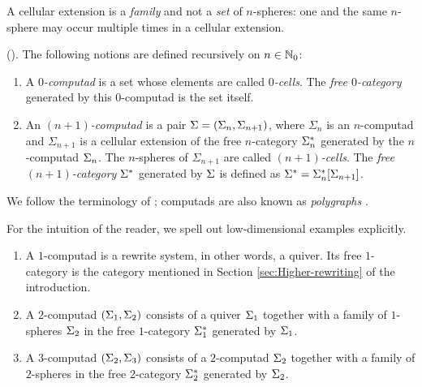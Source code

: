 \documentclass[reqno,12pt]{amsart}
\begin{document}
\begin{remark}
A cellular extension is a \emph{family} and not a \emph{set} of $n$-spheres: one and the same $n$-sphere may occur multiple times in a cellular extension.
\end{remark}

\begin{definition}\label{def:computad} (\cite[\S 1.2]{GuMa12}). The following notions are defined recursively on \(n\in \mathbb N_{0}\):
	\begin{enumerate}[label=(\roman*)]
		\item A \emph{\(0\)-computad} is a set whose elements are called \emph{$0$-cells}. The \emph{free $0$-category} generated by this $0$-computad is the set itself.
		\item An \emph{\((n+1)\)-computad} is a pair \(\Sigma=(\Sigma_n,\Sigma_{n+1})\), where \(\Sigma_n\) is an \(n\)-computad and \(\Sigma_{n+1}\) is a cellular extension of the free \(n\)-category \(\Sigma^{\ast}_{n}\) generated by the \(n\)-computad \(\Sigma_{n}\). The $n$-spheres of \(\Sigma_{n+1}\) are called \emph{$(n+1)$-cells}. The \emph{free \((n+1)\)-category \(\Sigma^{\ast}\)} generated by \(\Sigma\) is defined as \(\Sigma^{\ast}=\Sigma^{\ast}_n[\Sigma_{n+1}]\).
	\end{enumerate}
\end{definition}

\begin{remark}
We follow the terminology of \cite{St76,St96,Ba98}; computads are also known as \emph{polygraphs} \cite{B93}.
\end{remark}
For the intuition of the reader, we spell out low-dimensional examples explicitly.
\begin{example}
\begin{enumerate}[label=(\roman*)]
\item A $1$-computad is a rewrite system, in other words, a quiver. Its free $1$-category is the category mentioned in Section \ref{sec:Higher-rewriting} of the introduction.
\item A $2$-computad $(\Sigma_{1},\Sigma_{2})$	consists of a quiver $\Sigma_{1}$ together with a family of $1$-spheres $\Sigma_{2}$ in the free $1$-category $\Sigma_{1}^{\ast}$ generated by \(\Sigma_{1}\).
\item A $3$-computad $(\Sigma_{2},\Sigma_{3})$	consists of a $2$-computad $\Sigma_{2}$ together with a family of $2$-spheres in the free $2$-category $\Sigma_2^{\ast}$ generated by $\Sigma_{2}$.
\end{enumerate}
\end{example}
\end{document}
